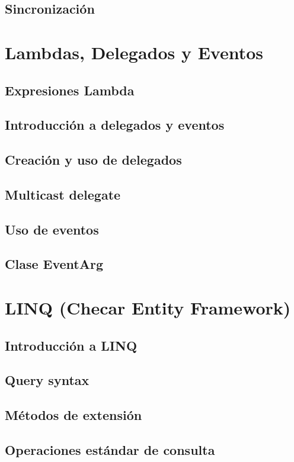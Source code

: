 \documentclass[12pt,a4paper]{report}
\begin{document}
\section{Sincronización}

\chapter{Lambdas, Delegados y Eventos}
\section{Expresiones Lambda}
\section{Introducción a delegados y eventos}
\section{Creación y uso de delegados}
\section{Multicast delegate}
\section{Uso de eventos}
\section{Clase EventArg}

\chapter{LINQ (Checar Entity Framework)}
\section{Introducción a LINQ}
\section{Query syntax}
\section{Métodos de extensión}
\section{Operaciones estándar de consulta}
\end{document}
